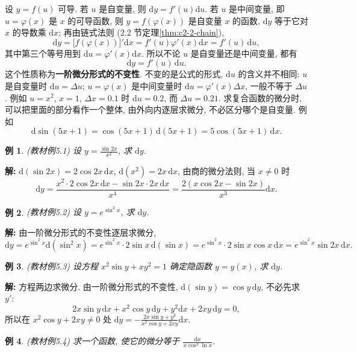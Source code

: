 \documentclass[UTF8,openany]{ctexbook}
\theoremstyle{chinesetextbook}
\newtheorem{example}{例}[section]
\newenvironment{cnsolution}{\par\indent\textbf{解:} \ignorespaces}{\par}
\newcommand{\dd}{\mathrm d}
\begin{document}
设 $y=f(u)$ 可导. 若 $u$ 是自变量, 则 $\dd y=f'(u)\dd u$. 若 $u$ 是中间变量, 即 $u=\varphi(x)$ 是 $x$ 的可导函数, 则 $y=f(\varphi(x))$ 是自变量 $x$ 的函数, $\dd y$ 等于它对 $x$ 的导数乘 $\dd x$; 再由链式法则 (2.2 节定理\ref{thm:c2-2-chain}),
\[
\dd y=\bigl[f(\varphi(x))\bigr]'\dd x=f'(u)\varphi'(x)\dd x=f'(u)\,\dd u,
\]
其中第三个等号用到 $\dd u=\varphi'(x)\dd x$. 所以不论 $u$ 是自变量还是中间变量, 都有
\[
\dd y=f'(u)\,\dd u.
\]
这个性质称为\textbf{一阶微分形式的不变性}. 不变的是公式的形式, $\dd u$ 的含义并不相同: $u$ 是自变量时 $\dd u=\Delta u$; $u=\varphi(x)$ 是中间变量时 $\dd u=\varphi'(x)\Delta x$, 一般不等于 $\Delta u$. 例如 $u=x^2$, $x=1$, $\Delta x=0.1$ 时 $\dd u=0.2$, 而 $\Delta u=0.21$. 求复合函数的微分时, 可以把里面的部分看作一个整体, 由外向内逐层求微分, 不必区分哪个是自变量. 例如
\[
\dd\sin(5x+1)=\cos(5x+1)\,\dd(5x+1)=5\cos(5x+1)\,\dd x.
\]
\begin{example}\label{ex:c2-5-1}
\textnormal{(教材例5.1)} 设 $\displaystyle y=\frac{\sin2x}{x^2}$, 求 $\dd y$.
\end{example}
\begin{cnsolution}
$\dd(\sin2x)=2\cos2x\,\dd x$, $\dd(x^2)=2x\,\dd x$, 由商的微分法则, 当 $x\ne0$ 时
\[
\dd y=\frac{x^2\cdot2\cos2x\,\dd x-\sin2x\cdot2x\,\dd x}{x^4}=\frac{2(x\cos2x-\sin2x)}{x^3}\dd x.
\]
\end{cnsolution}
\begin{example}\label{ex:c2-5-2}
\textnormal{(教材例5.2)} 设 $y=e^{\sin^2x}$, 求 $\dd y$.
\end{example}
\begin{cnsolution}
由一阶微分形式的不变性逐层求微分,
\[
\dd y=e^{\sin^2x}\dd(\sin^2x)=e^{\sin^2x}\cdot2\sin x\,\dd(\sin x)=e^{\sin^2x}\cdot2\sin x\cos x\,\dd x=e^{\sin^2x}\sin2x\,\dd x.
\]
\end{cnsolution}
\begin{example}\label{ex:c2-5-3}
\textnormal{(教材例5.3)} 设方程 $x^2\sin y+xy^2=1$ 确定隐函数 $y=y(x)$, 求 $\dd y$.
\end{example}
\begin{cnsolution}
方程两边求微分. 由一阶微分形式的不变性, $\dd(\sin y)=\cos y\,\dd y$, 不必先求 $y'$:
\[
2x\sin y\,\dd x+x^2\cos y\,\dd y+y^2\dd x+2xy\,\dd y=0,
\]
所以在 $x^2\cos y+2xy\ne0$ 处 $\displaystyle\dd y=-\frac{2x\sin y+y^2}{x^2\cos y+2xy}\dd x$.
\end{cnsolution}
\begin{example}\label{ex:c2-5-4}
\textnormal{(教材例5.4)} 求一个函数, 使它的微分等于 $\displaystyle\frac{\dd x}{x\cos^2\ln x}$.
\end{example}
\end{document}

